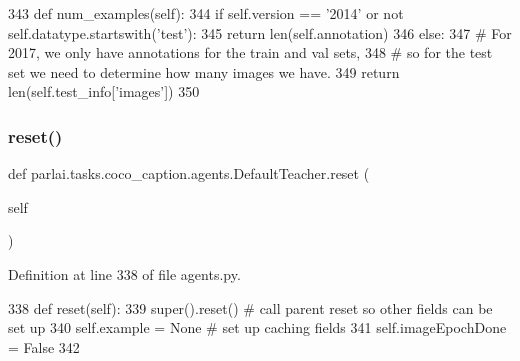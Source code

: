 \begin{DoxyCode}
343     \textcolor{keyword}{def }num\_examples(self):
344         \textcolor{keywordflow}{if} self.version == \textcolor{stringliteral}{'2014'} \textcolor{keywordflow}{or} \textcolor{keywordflow}{not} self.datatype.startswith(\textcolor{stringliteral}{'test'}):
345             \textcolor{keywordflow}{return} len(self.annotation)
346         \textcolor{keywordflow}{else}:
347             \textcolor{comment}{# For 2017, we only have annotations for the train and val sets,}
348             \textcolor{comment}{# so for the test set we need to determine how many images we have.}
349             \textcolor{keywordflow}{return} len(self.test\_info[\textcolor{stringliteral}{'images'}])
350 
\end{DoxyCode}
\mbox{\label{classparlai_1_1tasks_1_1coco__caption_1_1agents_1_1DefaultTeacher_ac3b29ac1add9d464b365d472caafcbaa}} 
\subsubsection{\texorpdfstring{reset()}{reset()}}
{\footnotesize\ttfamily def parlai.\+tasks.\+coco\+\_\+caption.\+agents.\+Default\+Teacher.\+reset (\begin{DoxyParamCaption}\item[{}]{self }\end{DoxyParamCaption})}



Definition at line 338 of file agents.\+py.


\begin{DoxyCode}
338     \textcolor{keyword}{def }reset(self):
339         super().reset()  \textcolor{comment}{# call parent reset so other fields can be set up}
340         self.example = \textcolor{keywordtype}{None}  \textcolor{comment}{# set up caching fields}
341         self.imageEpochDone = \textcolor{keyword}{False}
342 
\end{DoxyCode}
\mbox{\label{classparlai_1_1tasks_1_1coco__caption_1_1agents_1_1DefaultTeacher_a9b7c2be6b8702f1aec7087a568b3439c}} 
